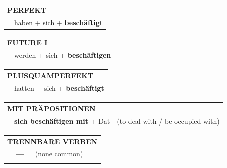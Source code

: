 \documentclass[10pt,a4paper]{revtex4-2}
\begin{document}
\begin{verbbox}
    \vspace{10pt}

 \begin{tabular}{rl}
     \multicolumn{2}{l}{\textbf{PERFEKT}}\\
   & haben + sich + \textbf{beschäftigt}\\
  \end{tabular}
\hfill
   \begin{tabular}{rl}
    \multicolumn{2}{l}{\textbf{FUTURE I} }\\
   & werden + sich + \textbf{beschäftigen}\\
  \end{tabular}
\hfill
   \begin{tabular}{rl}
      \multicolumn{2}{l}{\textbf{PLUSQUAMPERFEKT}}\\
   & hatten + sich + \textbf{beschäftigt}\\
  \end{tabular}

   \vspace{10pt}

   \begin{tabular}{lll}
      \multicolumn{3}{l}{\textbf{MIT PRÄPOSITIONEN}}\\
& \textbf{sich beschäftigen mit} + Dat & (to deal with / be occupied with)\\
\end{tabular}
  \hfill
   \begin{tabular}{lll}
      \multicolumn{3}{l}{\textbf{TRENNBARE VERBEN}}\\
 & \textbf{---} & (none common)\\
\vspace{10pt}
  \end{tabular}

  \vspace{-5pt}

\end{verbbox}
\end{document}
